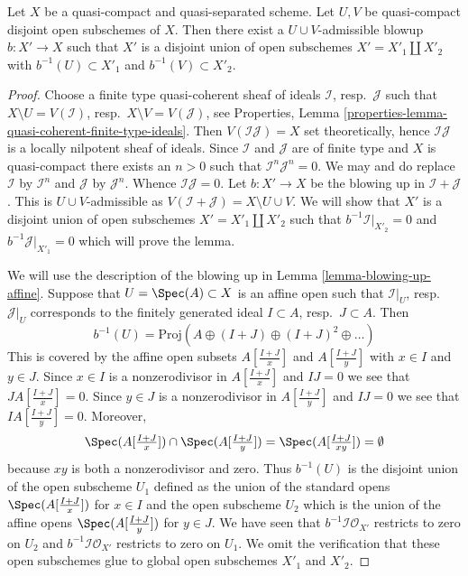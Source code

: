 \begin{lemma}
\label{lemma-separate-disjoint-opens-by-blowing-up}
Let $X$ be a quasi-compact and quasi-separated scheme.
Let $U, V$ be quasi-compact disjoint open subschemes of $X$.
Then there exist a $U \cup V$-admissible blowup $b : X' \to X$
such that $X'$ is a disjoint union of open subschemes
$X' = X'_1 \amalg X'_2$ with $b^{-1}(U) \subset X'_1$ and
$b^{-1}(V) \subset X'_2$.
\end{lemma}

\begin{proof}
Choose a finite type quasi-coherent sheaf of ideals $\mathcal{I}$,
resp.\ $\mathcal{J}$ such that $X \setminus U = V(\mathcal{I})$,
resp.\ $X \setminus V = V(\mathcal{J})$, see
Properties, Lemma \ref{properties-lemma-quasi-coherent-finite-type-ideals}.
Then $V(\mathcal{I}\mathcal{J}) = X$ set theoretically, hence
$\mathcal{I}\mathcal{J}$ is a locally nilpotent sheaf of ideals.
Since $\mathcal{I}$ and $\mathcal{J}$ are of finite type and $X$
is quasi-compact there exists an $n > 0$ such that
$\mathcal{I}^n \mathcal{J}^n = 0$. We may and do replace $\mathcal{I}$
by $\mathcal{I}^n$ and $\mathcal{J}$ by $\mathcal{J}^n$. Whence
$\mathcal{I} \mathcal{J} = 0$. Let $b : X' \to X$ be the blowing
up in $\mathcal{I} + \mathcal{J}$. This is $U \cup V$-admissible
as $V(\mathcal{I} + \mathcal{J}) = X \setminus U \cup V$. We will show that
$X'$ is a disjoint union of open subschemes $X' = X'_1 \amalg X'_2$
such that $b^{-1}\mathcal{I}|_{X'_2} = 0$ and $b^{-1}\mathcal{J}|_{X'_1} = 0$
which will prove the lemma.

\medskip\noindent
We will use the description of the blowing up in
Lemma \ref{lemma-blowing-up-affine}. Suppose that $U = \Spec(A) \subset X$
is an affine open such that $\mathcal{I}|_U$, resp.\ $\mathcal{J}|_U$
corresponds to the finitely generated ideal $I \subset A$, resp.\ $J \subset A$.
Then
$$
b^{-1}(U) = \text{Proj}(A \oplus (I + J) \oplus (I + J)^2 \oplus \ldots)
$$
This is covered by the affine open subsets $A[\frac{I + J}{x}]$
and $A[\frac{I + J}{y}]$ with $x \in I$ and $y \in J$. Since $x \in I$ is a
nonzerodivisor in $A[\frac{I + J}{x}]$ and $IJ = 0$ we see that
$J A[\frac{I + J}{x}] = 0$. Since $y \in J$ is a nonzerodivisor
in $A[\frac{I + J}{y}]$ and $IJ = 0$ we see that
$I A[\frac{I + J}{y}] = 0$. Moreover,
$$
\Spec(A[\textstyle{\frac{I + J}{x}}]) \cap
\Spec(A[\textstyle{\frac{I + J}{y}}]) =
\Spec(A[\textstyle{\frac{I + J}{xy}}]) = \emptyset
$$
because $xy$ is both a nonzerodivisor and zero. Thus $b^{-1}(U)$
is the disjoint union of the open subscheme $U_1$ defined as the union 
of the standard opens $\Spec(A[\frac{I + J}{x}])$ for $x \in I$ and the open
subscheme $U_2$ which is the union of the affine opens
$\Spec(A[\frac{I + J}{y}])$ for $y \in J$. We have seen that
$b^{-1}\mathcal{I}\mathcal{O}_{X'}$ restricts to zero on $U_2$
and $b^{-1}\mathcal{I}\mathcal{O}_{X'}$ restricts to zero on $U_1$.
We omit the verification that these open subschemes glue to global
open subschemes $X'_1$ and $X'_2$.
\end{proof}


















